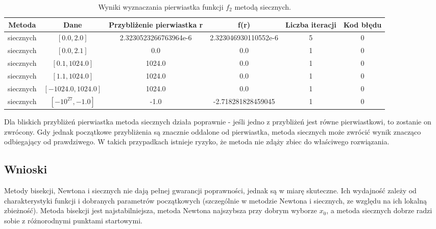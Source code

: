 \documentclass{article}
\begin{document}
\begin{enumerate}[label=(\alph*)]
        \begin{table}[H]
    \centering
    \begin{tabular}{|c|c||c|c|c|c|}
        \hline
        Metoda & Dane & Przybliżenie pierwiastka r & f(r) & Liczba iteracji & Kod błędu\\
        \hline
        \hline
        siecznych & $[0.0, 2.0]$ & 2.3230523266763964e-6 & 2.323046930110552e-6 & 5 & 0 \\
        \hline
        siecznych & $[0.0, 2.1]$ & 0.0 & 0.0 & 1 & 0 \\
        \hline
        siecznych & $[0.1, 1024.0]$ &1024.0 & 0.0 & 1 & 0 \\
        \hline
        siecznych & $[1.1, 1024.0]$ & 1024.0 & 0.0 & 1 & 0 \\
        \hline
                siecznych & $[-1024.0, 1024.0]$ &  1024.0 & 0.0 & 1 & 0\\
        \hline
        siecznych & $[-10^{27}, -1.0]$ &-1.0 & -2.718281828459045 & 1 & 0 \\
        \hline
    \end{tabular}
    \caption{Wyniki wyznaczania pierwiastka funkcji $f_2$ metodą siecznych.}
\end{table}
Dla bliskich przybliżeń pierwiastka metoda siecznych działa poprawnie - jeśli jedno z przybliżeń jest równe pierwiastkowi, to zostanie on zwrócony. Gdy jednak początkowe przybliżenia są znacznie oddalone od pierwiastka, metoda siecznych może zwrócić wynik znacząco odbiegający od prawdziwego. W takich przypadkach istnieje ryzyko, że metoda nie zdąży zbiec do właściwego rozwiązania.
\end{enumerate}

\subsection{Wnioski}
Metody bisekcji, Newtona i siecznych nie dają pełnej gwarancji poprawności, jednak są w miarę skuteczne. Ich wydajność zależy od charakterystyki funkcji i dobranych parametrów początkowych (szczególnie w metodzie Newtona i siecznych, ze względu na ich lokalną zbieżność). Metoda bisekcji jest najstabilniejsza, metoda Newtona najszybsza przy dobrym wyborze $x_0$, a metoda siecznych dobrze radzi sobie z różnorodnymi punktami startowymi.
\end{document}
